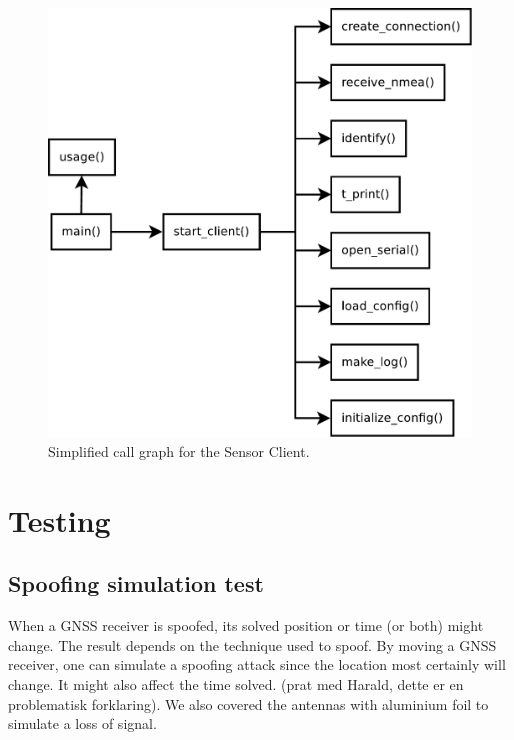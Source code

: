 \documentclass[12pt,english,a4paper]{report}
\begin{document}
\begin{figure}\label{client_call_graph}
\centering
  \includegraphics[scale=0.3]{client_call_graph.pdf}
   \caption[Sensor Client simplified call graph]{Simplified call graph for the Sensor Client.}
\end{figure}


\chapter{Testing}

\section{Spoofing simulation test}
When a GNSS receiver is spoofed, its solved position or time (or both) might change. The result depends on the technique used to spoof. By moving a GNSS receiver, one can simulate a spoofing attack since the location most certainly will change. It might also affect the time solved. (prat med Harald, dette er en problematisk forklaring). We also covered the antennas with aluminium foil to simulate a loss of signal. 
\end{document}

